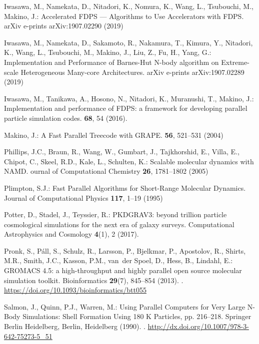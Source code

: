 \begin{thebibliography}{10}
{Iwasawa}, M., {Namekata}, D., {Nitadori}, K., {Nomura}, K., {Wang}, L.,
  {Tsubouchi}, M., {Makino}, J.: {Accelerated FDPS --- Algorithms to Use
  Accelerators with FDPS}.
\newblock arXiv e-prints arXiv:1907.02290 (2019)

{Iwasawa}, M., {Namekata}, D., {Sakamoto}, R., {Nakamura}, T., {Kimura}, Y.,
  {Nitadori}, K., {Wang}, L., {Tsubouchi}, M., {Makino}, J., {Liu}, Z., {Fu},
  H., {Yang}, G.: {Implementation and Performance of Barnes-Hut N-body
  algorithm on Extreme-scale Heterogeneous Many-core Architectures}.
\newblock arXiv e-prints arXiv:1907.02289 (2019)

{Iwasawa}, M., {Tanikawa}, A., {Hosono}, N., {Nitadori}, K., {Muranushi}, T.,
  {Makino}, J.: {Implementation and performance of FDPS: a framework for
  developing parallel particle simulation codes}.
\newblock \pasj \textbf{68}, 54 (2016).
\newblock {}

{Makino}, J.: {A Fast Parallel Treecode with GRAPE}.
\newblock \pasj \textbf{56}, 521--531 (2004)

Phillips, J.C., Braun, R., Wang, W., Gumbart, J., Tajkhorshid, E., Villa, E.,
  Chipot, C., Skeel, R.D., Kale, L., Schulten, K.: { Scalable molecular
  dynamics with NAMD}.
\newblock ournal of Computational Chemistry \textbf{26}, 1781--1802 (2005)

Plimpton, S.J.: {Fast Parallel Algorithms for Short-Range Molecular Dynamics}.
\newblock Journal of Computational Physics \textbf{117}, 1--19 (1995)

{Potter}, D., {Stadel}, J., {Teyssier}, R.: {PKDGRAV3: beyond trillion particle
  cosmological simulations for the next era of galaxy surveys}.
\newblock Computational Astrophysics and Cosmology \textbf{4}(1), 2 (2017).
\newblock {}

Pronk, S., Páll, S., Schulz, R., Larsson, P., Bjelkmar, P., Apostolov, R.,
  Shirts, M.R., Smith, J.C., Kasson, P.M., van~der Spoel, D., Hess, B.,
  Lindahl, E.: {GROMACS 4.5: a high-throughput and highly parallel open source
  molecular simulation toolkit}.
\newblock Bioinformatics \textbf{29}(7), 845--854 (2013).
\newblock {}.
\newblock \urlprefix\url{https://doi.org/10.1093/bioinformatics/btt055}

Salmon, J., Quinn, P.J., Warren, M.: Using Parallel Computers for Very Large
  N-Body Simulations: Shell Formation Using 180 K Particles, pp. 216--218.
\newblock Springer Berlin Heidelberg, Berlin, Heidelberg (1990).
\newblock {}.
\newblock \urlprefix\url{http://dx.doi.org/10.1007/978-3-642-75273-5\_51}


\end{thebibliography}
